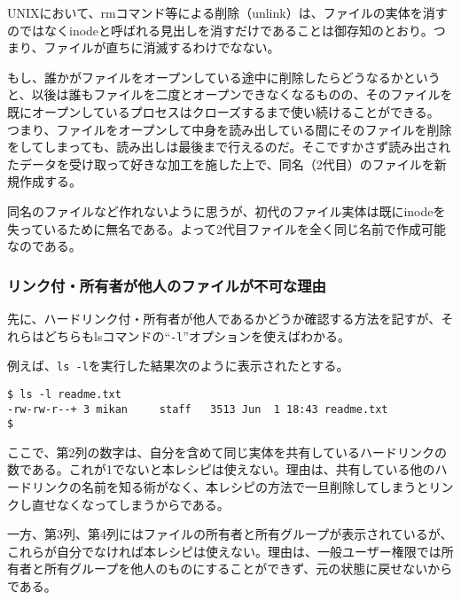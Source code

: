 UNIXにおいて、rmコマンド等による削除（unlink）は、ファイルの実体を消すのではなくinodeと呼ばれる見出しを消すだけであることは御存知のとおり。つまり、ファイルが直ちに消滅するわけでなない。

もし、誰かがファイルをオープンしている途中に削除したらどうなるかというと、以後は誰もファイルを二度とオープンできなくなるものの、そのファイルを既にオープンしているプロセスはクローズするまで使い続けることができる。
つまり、ファイルをオープンして中身を読み出している間にそのファイルを削除をしてしまっても、読み出しは最後まで行えるのだ。そこですかさず読み出されたデータを受け取って好きな加工を施した上で、同名（2代目）のファイルを新規作成する。

同名のファイルなど作れないように思うが、初代のファイル実体は既にinodeを失っているために無名である。よって2代目ファイルを全く同じ名前で作成可能なのである。

\subsubsection*{リンク付・所有者が他人のファイルが不可な理由}

先に、ハードリンク付・所有者が他人であるかどうか確認する方法を記すが、それらはどちらもlsコマンドの``\verb!-l!''オプションを使えばわかる。

例えば、\verb|ls -l|を実行した結果次のように表示されたとする。
\begin{screen}
	\verb|$ ls -l readme.txt| \return \\
	\verb|-rw-rw-r--+ 3 mikan     staff   3513 Jun  1 18:43 readme.txt| \\
	\verb|$ |
\end{screen}

ここで、第2列の数字は、自分を含めて同じ実体を共有しているハードリンクの数である。これが1でないと本レシピは使えない。理由は、共有している他のハードリンクの名前を知る術がなく、本レシピの方法で一旦削除してしまうとリンクし直せなくなってしまうからである。

一方、第3列、第4列にはファイルの所有者と所有グループが表示されているが、これらが自分でなければ本レシピは使えない。理由は、一般ユーザー権限では所有者と所有グループを他人のものにすることができず、元の状態に戻せないからである。
